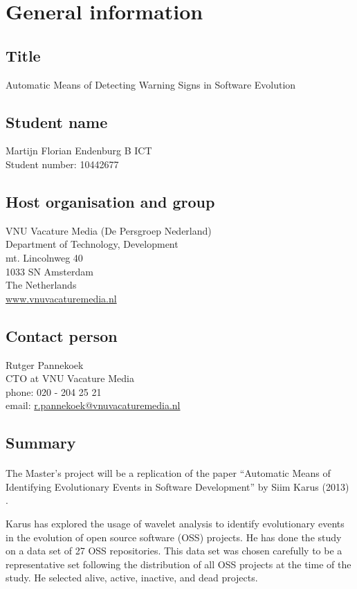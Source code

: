 \section{General information}
\subsection{Title}
Automatic Means of Detecting Warning Signs in Software Evolution

\subsection{Student name}
Martijn Florian Endenburg B ICT \\
Student number: 10442677

\subsection{Host organisation and group}
VNU Vacature Media (De Persgroep Nederland) \\
Department of Technology, Development \\
mt. Lincolnweg 40 \\
1033 SN Amsterdam \\
The Netherlands \\
\href{http://www.vnuvacaturemedia.nl}{www.vnuvacaturemedia.nl}

\subsection{Contact person}
Rutger Pannekoek \\
CTO at VNU Vacature Media \\
phone: 020 - 204 25 21 \\
email:
\href{mailto:r.pannekoek@vnuvacaturemedia.nl}{r.pannekoek@vnuvacaturemedia.nl}

\subsection{Summary}
\paragraph{}
The Master's project will be a replication of the paper ``Automatic Means of
Identifying Evolutionary Events in Software Development'' by Siim Karus (2013)
\cite{karus2013}.

Karus has explored the usage of wavelet analysis to identify evolutionary events
in the evolution of open source software (OSS) projects. He has done the study
on a data set of 27 OSS repositories. This data set was chosen carefully to be a
representative set following the distribution of all OSS projects at the time of
the study. He selected alive, active, inactive, and dead projects.

